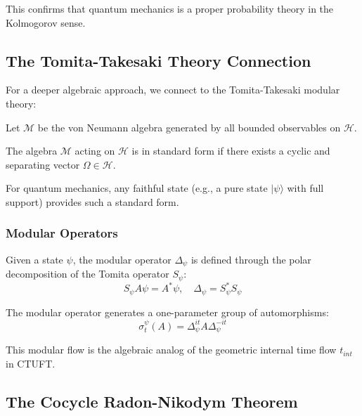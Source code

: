 This confirms that quantum mechanics is a proper probability theory in the Kolmogorov sense.

\subsection{The Tomita-Takesaki Theory Connection}

For a deeper algebraic approach, we connect to the Tomita-Takesaki modular theory:

\begin{definition}
Let $\mathcal{M}$ be the von Neumann algebra generated by all bounded observables on $\mathcal{H}$.
\end{definition}

\begin{theorem}
The algebra $\mathcal{M}$ acting on $\mathcal{H}$ is in standard form if there exists a cyclic and separating vector $\Omega \in \mathcal{H}$.
\end{theorem}

For quantum mechanics, any faithful state (e.g., a pure state $|\psi\rangle$ with full support) provides such a standard form.

\subsubsection{Modular Operators}

\begin{definition}
Given a state $\psi$, the modular operator $\Delta_\psi$ is defined through the polar decomposition of the Tomita operator $S_\psi$:
\begin{equation}
    S_\psi A\psi = A^*\psi, \quad \Delta_\psi = S_\psi^* S_\psi
\end{equation}
\end{definition}

\begin{theorem}
The modular operator generates a one-parameter group of automorphisms:
\begin{equation}
    \sigma_t^\psi(A) = \Delta_\psi^{it} A \Delta_\psi^{-it}
\end{equation}
\end{theorem}

This modular flow is the algebraic analog of the geometric internal time flow $t_{int}$ in CTUFT.

\subsection{The Cocycle Radon-Nikodym Theorem}

